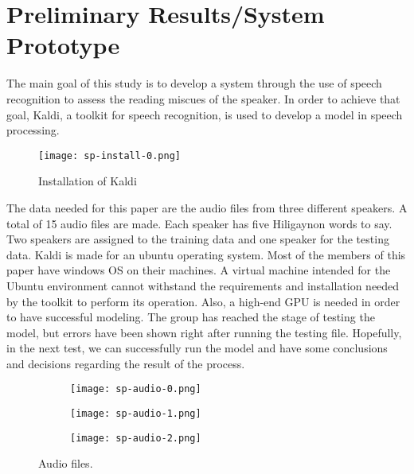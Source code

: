 \chapter{Preliminary Results/System Prototype}
The main goal of this study is to develop a system through the use of speech recognition to assess the reading miscues of the speaker. In order to achieve that goal, Kaldi, a toolkit for speech recognition, is used to develop a model in speech processing. 

\begin{figure}
    \texttt{[image: sp-install-0.png]}
    \caption{Installation of Kaldi}
    \label{fig:1}
  \end{figure}

The data needed for this paper are the audio files from three different speakers. A total of 15 audio files are made. Each speaker has five Hiligaynon words to say. Two speakers are assigned to the training data and one speaker for the testing data.
Kaldi is made for an ubuntu operating system. Most of the members of this paper have windows OS on their machines. A virtual machine intended for the Ubuntu environment cannot withstand the requirements and installation needed by the toolkit to perform its operation. Also, a high-end GPU is needed in order to have successful modeling. The group has reached the stage of testing the model, but errors have been shown right after running the testing file. Hopefully, in the next test, we can successfully run the model and have some conclusions and decisions regarding the result of the process.

\begin{figure}[h!]
    \centering
    \begin{subfigure}[b]{0.2\linewidth}
      \texttt{[image: sp-audio-0.png]}
    \end{subfigure}
    \begin{subfigure}[b]{0.2\linewidth}
      \texttt{[image: sp-audio-1.png]}
    \end{subfigure}
    \begin{subfigure}[b]{0.2\linewidth}
        \texttt{[image: sp-audio-2.png]}
      \end{subfigure}

    \caption{Audio files.}
    \label{fig:2}
  \end{figure}
  